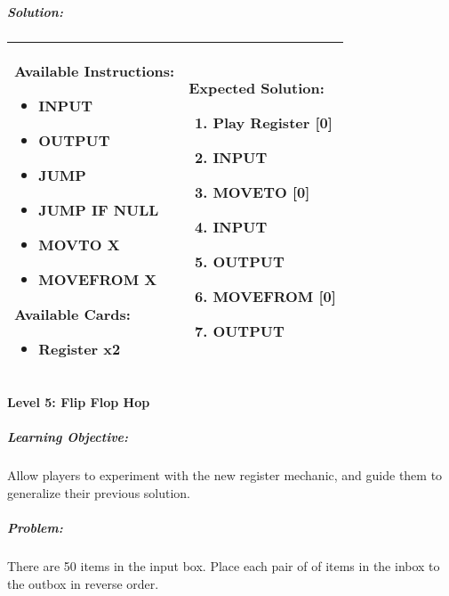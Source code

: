 \subparagraph{Solution:} 
\begin{center}
    \begin{tabular}{ | m{5cm} | m{9cm} | } 
        \hline
            \textbf{Available Instructions:} 
            \begin{itemize}
                \setlength\itemsep{-.35em}
                \item INPUT
                \item OUTPUT
                \item JUMP
                \item JUMP IF NULL
                \item MOVTO X
                \item MOVEFROM X
            \end{itemize}
            \textbf{Available Cards:} 
            \begin{itemize}
                \setlength\itemsep{-.35em}
                \item Register x2
            \end{itemize}& 
            \textbf{Expected Solution:} 
            \begin{enumerate}
                \setlength\itemsep{-.35em}
                \item Play Register [0]
                \item INPUT
                \item MOVETO [0]
                \item INPUT
                \item OUTPUT
                \item MOVEFROM [0] 
                \item OUTPUT
            \end{enumerate}
            \\
        \hline
    \end{tabular}
\end{center}
\newpage

\paragraph{Level 5: Flip Flop Hop}
\subparagraph{Learning Objective:} Allow players to experiment with the new register mechanic, and guide them to generalize their previous solution.

\subparagraph{Problem:} There are 50 items in the input box. Place each pair of of items in the inbox to the outbox in reverse order.

